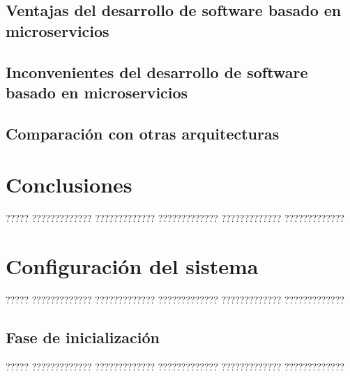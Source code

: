 \documentclass[11pt,spanish,listoffigures,listoftables]{tfgetsinf}
\begin{document}
\section{Ventajas del desarrollo de software basado en microservicios}

\section{Inconvenientes del desarrollo de software basado en microservicios}

\section{Comparación con otras arquitecturas}


\chapter{Conclusiones}

????? ????????????? ????????????? ????????????? ????????????? ????????????? 







\APPENDIX


\chapter{Configuración del sistema}

????? ????????????? ????????????? ????????????? ????????????? ?????????????

\section{Fase de inicialización}

????? ????????????? ????????????? ????????????? ????????????? ?????????????
\end{document}
